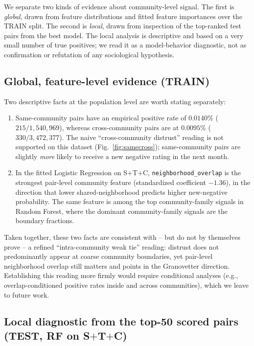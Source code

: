 \documentclass[conference]{IEEEtran}
\newcommand{\code}[1]{\texttt{#1}}
\begin{document}
We separate two kinds of evidence about community-level signal. The
first is \emph{global}, drawn from feature distributions and fitted
feature importances over the TRAIN split. The second is \emph{local},
drawn from inspection of the top-ranked test pairs from the best
model. The local analysis is descriptive and based on a very small
number of true positives; we read it as a model-behavior diagnostic,
not as confirmation or refutation of any sociological hypothesis.

\subsection{Global, feature-level evidence (TRAIN)}

Two descriptive facts at the population level are worth stating
separately:

\begin{enumerate}
\item Same-community pairs have an empirical positive rate of
$0.0140\%$ ($215 / 1{,}540{,}969$), whereas cross-community pairs are
at $0.0095\%$ ($330 / 3{,}472{,}377$). The naive ``cross-community
distrust'' reading is not supported on this dataset
(Fig.~\ref{fig:samecross}); same-community pairs are slightly
\emph{more} likely to receive a new negative rating in the next month.
\item In the fitted Logistic Regression on S$+$T$+$C,
\code{neighborhood\_overlap} is the strongest pair-level community
feature (standardized coefficient $-1.36$), in the direction that
lower shared-neighborhood predicts higher new-negative probability.
The same feature is among the top community-family signals in Random
Forest, where the dominant community-family signals are the boundary
fractions.
\end{enumerate}

Taken together, these two facts are consistent with -- but do not by
themselves prove -- a refined ``intra-community weak tie'' reading:
distrust does not predominantly appear at coarse community boundaries,
yet pair-level neighborhood overlap still matters and points in the
Granovetter direction. Establishing this reading more firmly would
require conditional analyses (e.g., overlap-conditioned positive rates
inside and across communities), which we leave to future work.

\subsection{Local diagnostic from the top-50 scored pairs (TEST, RF on
S$+$T$+$C)}
\end{document}
